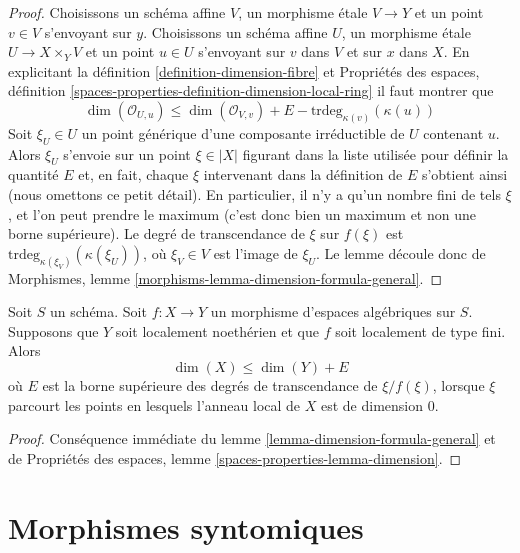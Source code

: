 \begin{proof}
Choisissons un schéma affine $V$, un morphisme étale $V \to Y$ et un point
$v \in V$ s'envoyant sur $y$. Choisissons un schéma affine $U$, un morphisme étale
$U \to X \times_Y V$ et un point $u \in U$ s'envoyant sur $v$ dans $V$ et sur $x$
dans $X$. En explicitant la définition \ref{definition-dimension-fibre} et
Propriétés des espaces, définition
\ref{spaces-properties-definition-dimension-local-ring}
il faut montrer que
$$
\dim(\mathcal{O}_{U, u}) \leq
\dim(\mathcal{O}_{V, v}) + E - \text{trdeg}_{\kappa(v)}(\kappa(u))
$$
Soit $\xi_U \in U$ un point générique d'une composante irréductible de
$U$ contenant $u$. Alors $\xi_U$ s'envoie sur un point $\xi \in |X|$
figurant dans la liste utilisée pour définir la quantité $E$ et, en fait,
chaque $\xi$ intervenant dans la définition de $E$ s'obtient ainsi
(nous omettons ce petit détail). En particulier, il n'y a qu'un nombre fini
de tels $\xi$, et l'on peut prendre le maximum (c'est donc bien
un maximum et non une borne supérieure).
Le degré de transcendance de $\xi$ sur $f(\xi)$ est
$\text{trdeg}_{\kappa(\xi_V)}(\kappa(\xi_U))$, où $\xi_V \in V$
est l'image de $\xi_U$. Le lemme découle donc de
Morphismes, lemme \ref{morphisms-lemma-dimension-formula-general}.
\end{proof}

\begin{lemma}
\label{lemma-alteration-dimension-general}
Soit $S$ un schéma.
Soit $f : X \to Y$ un morphisme d'espaces algébriques sur $S$. Supposons
que $Y$ soit localement noethérien et que $f$ soit localement de type fini.
Alors
$$
\dim(X) \leq \dim(Y) + E
$$
où $E$ est la borne supérieure des degrés de transcendance de
$\xi/f(\xi)$, lorsque $\xi$ parcourt les points en
lesquels l'anneau local de $X$ est de dimension $0$.
\end{lemma}

\begin{proof}
Conséquence immédiate du lemme \ref{lemma-dimension-formula-general}
et de Propriétés des espaces, lemme \ref{spaces-properties-lemma-dimension}.
\end{proof}







\section{Morphismes syntomiques}
\label{section-syntomic}

